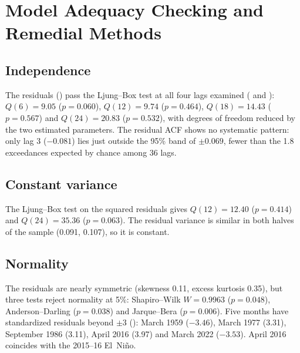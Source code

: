 \documentclass[11pt,letterpaper]{article}
\begin{document}
\section{Model Adequacy Checking and Remedial Methods}
\subsection{Independence}
The residuals () pass the Ljung--Box test at all four lags examined ( and ): $Q(6) = 9.05$ ($p=0.060$), $Q(12) = 9.74$ ($p=0.464$), $Q(18)=14.43$ ($p=0.567$) and $Q(24)=20.83$ ($p=0.532$), with degrees of freedom reduced by the two estimated parameters. The residual ACF shows no systematic pattern: only lag 3 ($-0.081$) lies just outside the 95\% band of $\pm0.069$, fewer than the 1.8 exceedances expected by chance among 36 lags.

\subsection{Constant variance}
The Ljung--Box test on the squared residuals gives $Q(12)=12.40$ ($p=0.414$) and $Q(24)=35.36$ ($p=0.063$). The residual variance is similar in both halves of the sample (0.091, 0.107), so it is constant.

\subsection{Normality}
The residuals are nearly symmetric (skewness 0.11, excess kurtosis 0.35), but three tests reject normality at 5\%: Shapiro--Wilk $W = 0.9963$ ($p=0.048$), Anderson--Darling ($p=0.038$) and Jarque--Bera ($p=0.006$). Five months have standardized residuals beyond $\pm3$ (): March 1959 ($-3.46$), March 1977 (3.31), September 1986 (3.11), April 2016 (3.97) and March 2022 ($-3.53$). April 2016 coincides with the 2015--16 El~Ni\~no.
\end{document}
